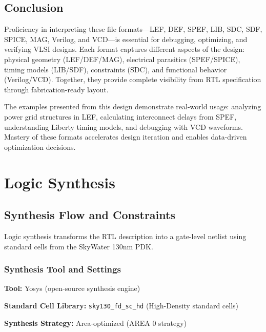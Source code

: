 \documentclass[12pt,a4paper]{article}
\begin{document}
\newpage




\subsection{Conclusion}

Proficiency in interpreting these file formats—LEF, DEF, SPEF, LIB, SDC, SDF, SPICE, MAG, Verilog, and VCD—is essential for debugging, optimizing, and verifying VLSI designs. Each format captures different aspects of the design: physical geometry (LEF/DEF/MAG), electrical parasitics (SPEF/SPICE), timing models (LIB/SDF), constraints (SDC), and functional behavior (Verilog/VCD). Together, they provide complete visibility from RTL specification through fabrication-ready layout.

The examples presented from this design demonstrate real-world usage: analyzing power grid structures in LEF, calculating interconnect delays from SPEF, understanding Liberty timing models, and debugging with VCD waveforms. Mastery of these formats accelerates design iteration and enables data-driven optimization decisions.










\section{Logic Synthesis}

\subsection{Synthesis Flow and Constraints}

Logic synthesis transforms the RTL description into a gate-level netlist using standard cells from the SkyWater 130nm PDK.

\subsubsection{Synthesis Tool and Settings}

\textbf{Tool:} Yosys (open-source synthesis engine)

\textbf{Standard Cell Library:} \texttt{sky130\_fd\_sc\_hd} (High-Density standard cells)

\textbf{Synthesis Strategy:} Area-optimized (AREA 0 strategy)
\end{document}
